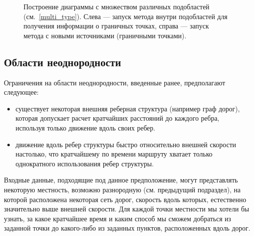 \documentclass[12pt]{article}
\begin{document}
\begin{figure}
\begin{center}
\end{center}
\caption{Построение диаграммы с множеством различных подобластей (см.~\ref{multi_type}). 
Слева --- запуск метода внутри подобластей
для получения информации о граничных точках, справа --- запуск метода
с новыми источниками (граничными точками).}
\label{multi_type_fig}
\end{figure}

\subsection{Области неоднородности}
Ограничения на области неоднородности, введенные ранее, предполагают следующее:
\begin{itemize}
\item существует некоторая внешняя реберная структура (например граф дорог), 
которая допускает расчет кратчайших расстояний до каждого ребра, используя
только движение вдоль своих ребер.
\item движение вдоль ребер структуры быстро относительно внешней скорости 
настолько, что кратчайшему по времени маршруту хватает только однократного использования
ребер структуры.
\end{itemize}
Входные данные, подходящие под данное предположение, могут представлять
некоторую местность, возможно разнородную (см. предыдущий подраздел), на которой
расположена некоторая сеть дорог, скорость вдоль которых, естественно
значительно выше внешней скорости. Для каждой точки местности мы хотели 
бы узнать, за какое кратчайшее время и каким способ мы сможем добраться 
из заданной точки до какого-либо из заданных пунктов, расположенных вдоль дорог.
\end{document}
